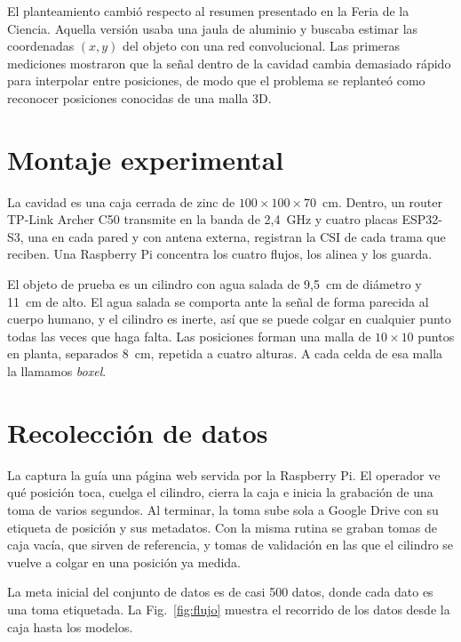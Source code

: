 \documentclass[10pt,journal]{IEEEtran}
\begin{document}
El planteamiento cambió respecto al resumen presentado en la Feria de la Ciencia. Aquella versión usaba una jaula de aluminio y buscaba estimar las coordenadas $(x,y)$ del objeto con una red convolucional. Las primeras mediciones mostraron que la señal dentro de la cavidad cambia demasiado rápido para interpolar entre posiciones, de modo que el problema se replanteó como reconocer posiciones conocidas de una malla 3D.

\section{Montaje experimental}\label{sec:montaje}
La cavidad es una caja cerrada de zinc de $100 \times 100 \times 70$~cm. Dentro, un router TP-Link Archer C50 transmite en la banda de 2,4~GHz y cuatro placas ESP32-S3, una en cada pared y con antena externa, registran la CSI de cada trama que reciben. Una Raspberry Pi concentra los cuatro flujos, los alinea y los guarda.

El objeto de prueba es un cilindro con agua salada de 9,5~cm de diámetro y 11~cm de alto. El agua salada se comporta ante la señal de forma parecida al cuerpo humano, y el cilindro es inerte, así que se puede colgar en cualquier punto todas las veces que haga falta. Las posiciones forman una malla de $10 \times 10$ puntos en planta, separados 8~cm, repetida a cuatro alturas. A cada celda de esa malla la llamamos \emph{boxel}.

\section{Recolección de datos}\label{sec:recoleccion}
La captura la guía una página web servida por la Raspberry Pi. El operador ve qué posición toca, cuelga el cilindro, cierra la caja e inicia la grabación de una toma de varios segundos. Al terminar, la toma sube sola a Google Drive con su etiqueta de posición y sus metadatos. Con la misma rutina se graban tomas de caja vacía, que sirven de referencia, y tomas de validación en las que el cilindro se vuelve a colgar en una posición ya medida.

La meta inicial del conjunto de datos es de casi 500 datos, donde cada dato es una toma etiquetada. La Fig.~\ref{fig:flujo} muestra el recorrido de los datos desde la caja hasta los modelos.
\end{document}
